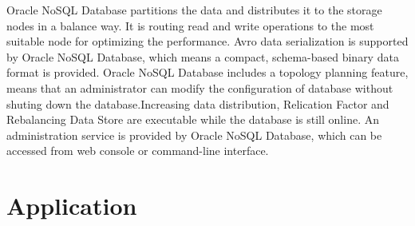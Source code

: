 Oracle NoSQL Database partitions the data and distributes it to the storage nodes in a balance way. It is routing read and write operations to the most suitable node for optimizing the performance.\cite{hid-sp18-515-editor00}
Avro data serialization is supported by Oracle NoSQL Database, which means a compact, schema-based binary data format is provided.\cite{hid-sp18-515-editor00}
Oracle NoSQL Database includes a topology planning feature, means that an administrator can modify the configuration of database without shuting down the database.Increasing data distribution, Relication Factor and Rebalancing Data Store are executable while the database is still online. \cite{hid-sp18-515-editor00}
An administration service is provided by Oracle NoSQL Database, which can be accessed from web console or command-line interface. 


\section{Application}

